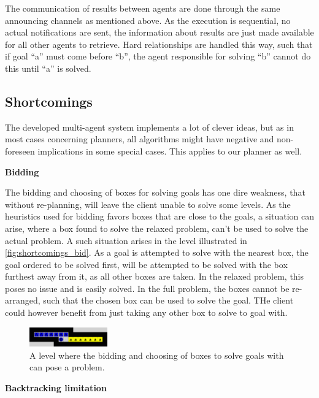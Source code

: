 \documentclass[Main]{subfiles}
\begin{document}
The communication of results between agents are done through the same announcing channels as mentioned above. As the execution is sequential, no actual notifications are sent, the information about results are just made available for all other agents to retrieve. Hard relationships are handled this way, such that if goal ``a'' must come before ``b'', the agent responsible for solving ``b'' cannot do this until ``a'' is solved.  





\subsection{Shortcomings}
The developed multi-agent system implements a lot of clever ideas, but as in most cases concerning planners, all algorithms might have negative and non-foreseen implications in some special cases. This applies to our planner as well. 


\textbf{Bidding}

The bidding and choosing of boxes for solving goals has one dire weakness, that without re-planning, will leave the client unable to solve some levels. As the heuristics used for bidding favors boxes that are close to the goals, a situation can arise, where a box found to solve the relaxed problem, can't be used to solve the actual problem. A such situation arises in the level illustrated in \autoref{fig:shortcomings_bid}. As a goal is attempted to solve with the nearest box, the goal ordered to be solved first, will be attempted to be solved with the box furthest away from it, as all other boxes are taken. In the relaxed problem, this poses no issue and is easily solved. In the full problem, the boxes cannot be re-arranged, such that the chosen box can be used to solve the goal. THe client could however benefit from just taking any other box to solve to goal with. 
\begin{figure}[h!]
    \centering
    \includegraphics[width=0.3\textwidth]{shortcomings.png}
    \caption{A level where the bidding and choosing of boxes to solve goals with can pose a problem.}
    \label{fig:shortcomings_bid}
\end{figure}



\textbf{Backtracking limitation}
\end{document}
